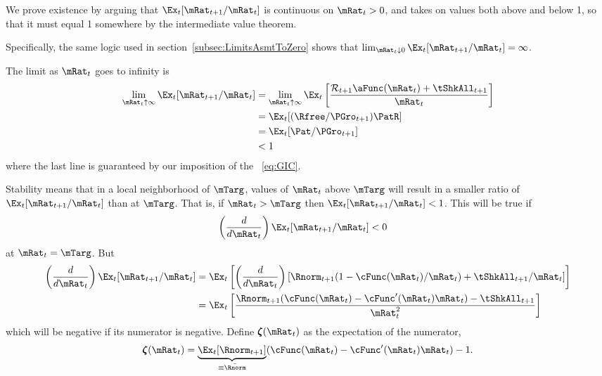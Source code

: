 \documentclass[./BufferStockTheory.tex]{subfiles}
\begin{document}
We prove existence by arguing that $\Ex_t [{\mRat}_{t+1}/\mRat_t]$ is
continuous on $\mRat_{t}>0$, %
and takes on values both above and below 1,
so that it must equal 1 somewhere by the intermediate
value theorem.

Specifically, the same logic used in section~\ref{subsec:LimitsAsmtToZero} shows
that $\lim_{\mRat_t \downarrow 0} \Ex_t [{\mRat}_{t+1}/\mRat_t] =
\infty$.

The limit as $\mRat_{t}$ goes to infinity is
\begin{align*}
  \lim_{\mRat_{t} \uparrow \infty} \Ex_{t}[{\mRat}_{t+1}/\mRat_{t}]  & =   \lim_{\mRat_{t} \uparrow \infty} \Ex_{t}\left[\frac{{\mathcal{\mathcal{R}}}_{t+1}\aFunc(\mRat_{t})+{\tShkAll}_{t+1}}{\mRat_{t}}\right]
\\  & = \Ex_{t}[(\Rfree/{\PGro}_{t+1})\PatR]
\\  & = \Ex_{t}[{\Pat}/{\PGro}_{t+1}]
\\  & < 1
\end{align*}
where the last line is guaranteed by our imposition of the \GIC~\eqref{eq:GIC}.

Stability means that in a local neighborhood of $\mTarg$, values of $\mRat_{t}$
above $\mTarg$ will result in a smaller ratio of $\Ex_{t}[{\mRat}%
_{t+1}/\mRat_{t}] $ than at $\mTarg$. That is, if $\mRat_{t} > \mTarg$ then $%
\Ex_{t}[\mRat_{t+1}/\mRat_{t}] < 1 $. This will be true if
\begin{align}
\left(\frac{d}{d\mRat_t}\right) \Ex_t [{\mRat}_{t+1}/\mRat_t ]  & < 0 \label{eq:stable} \nonumber
\end{align}
at $\mRat_{t}=\mTarg$.  But \providecommand{\numFunc}{\pmb{\zeta}}
\begin{align*}
\left( \frac{d}{d\mRat_{t}}\right) \Ex_{t}[{\mRat}_{t+1}/\mRat_{t}]  & = \Ex_{t}\left[
\left( \frac{d}{d\mRat_{t}}\right) \left[ {\Rnorm}_{t+1}(1-\cFunc(\mRat_{t})/\mRat_{t})+%
{\tShkAll}_{t+1}/\mRat_{t}\right] \right]  \nonumber \\
 & = \Ex_{t}\left[ \frac{{\Rnorm}_{t+1}(\cFunc(\mRat_{t})-\cFunc^{\prime}(\mRat_{t})\mRat_{t})-%
{\tShkAll}_{t+1}}{\mRat_{t}^{2}}\right]  \notag
\end{align*}
which will be negative if its numerator is negative. Define $\numFunc(\mRat_{t})$
as the expectation of the numerator,
\begin{equation}
\numFunc (\mRat_{t})=\underbrace{\Ex_{t}[{\Rnorm}_{t+1}]}_{\equiv \bar{\Rnorm}}(\cFunc(\mRat_{t})-\cFunc^{\prime}(\mRat_{t})\mRat_{t})-1. \label{eq:numer}
\end{equation}
\end{document}
